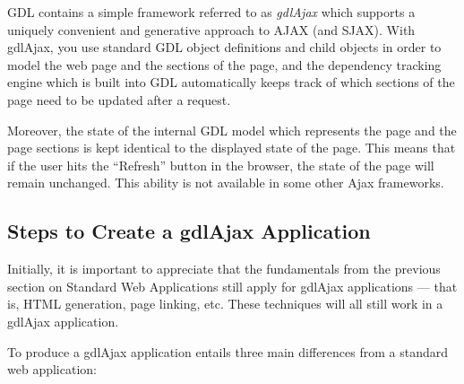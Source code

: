 \documentclass [11pt]{book}
\begin{document}
GDL contains a simple framework referred to as \emph{gdlAjax} which supports a uniquely convenient and generative
approach to AJAX (and SJAX). With gdlAjax, you use standard GDL
object definitions and child objects in order to model the web page
and the sections of the page, and the dependency tracking engine which
is built into GDL automatically keeps track of which sections of the
page need to be updated after a request.



Moreover, the state of the internal GDL model which
represents the page and the page sections is kept identical to the
displayed state of the page. This means that if the user hits the
``Refresh'' button in the browser, the state of the page will remain
unchanged. This ability is not available in some other Ajax
frameworks.



\subsection{Steps to Create a gdlAjax Application}

\label{subsec:stepstocreateagdlajaxapplication}



Initially, it is important to appreciate that the
fundamentals from the previous section on Standard Web Applications
still apply for gdlAjax applications --- that is, HTML generation,
page linking, etc. These techniques will all still work in a gdlAjax
application.



To produce a gdlAjax application entails three main differences from
a standard web application:
\end{document}
